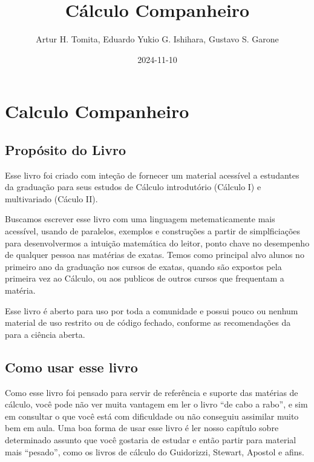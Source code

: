 \documentclass[
  letterpaper,
  DIV=11,
  numbers=noendperiod]{scrreprt}
\title{Cálculo Companheiro}
\author{Artur H. Tomita, Eduardo Yukio G. Ishihara, Gustavo S. Garone}
\date{2024-11-10}
\renewcommand*\contentsname{Índice}
\newcommand\contentsname{Índice}
\begin{document}
\maketitle

\renewcommand*\contentsname{Índice}
{
\hypersetup{linkcolor=}
\setcounter{tocdepth}{2}
\tableofcontents
}


\chapter*{Calculo Companheiro}\label{calculo-companheiro}


\section*{Propósito do Livro}\label{propuxf3sito-do-livro}


Esse livro foi criado com inteção de fornecer um material acessível a
estudantes da graduação para seus estudos de Cálculo introdutório
(Cálculo I) e multivariado (Cáculo II).

Buscamos escrever esse livro com uma linguagem metematicamente mais
acessível, usando de paralelos, exemplos e construções a partir de
simplficiações para desenvolvermos a intuição matemática do leitor,
ponto chave no desempenho de qualquer pessoa nas matérias de exatas.
Temos como principal alvo alunos no primeiro ano da graduação nos cursos
de exatas, quando são expostos pela primeira vez ao Cálculo, ou aos
publicos de outros cursos que frequentam a matéria.

Esse livro é aberto para uso por toda a comunidade e possui pouco ou
nenhum material de uso restrito ou de código fechado, conforme as
recomendações da \textcite{unesco_recomendacao_2022} para a ciência
aberta.

\section*{Como usar esse livro}\label{como-usar-esse-livro}


Como esse livro foi pensado para servir de referência e suporte das
matérias de cálculo, você pode não ver muita vantagem em ler o livro
``de cabo a rabo'', e sim em consultar o que você está com dificuldade
ou não conseguiu assimilar muito bem em aula. Uma boa forma de usar esse
livro é ler nosso capítulo sobre determinado assunto que você gostaria
de estudar e então partir para material mais ``pesado'', como os livros
de cálculo do Guidorizzi, Stewart, Apostol e afins.
\end{document}
